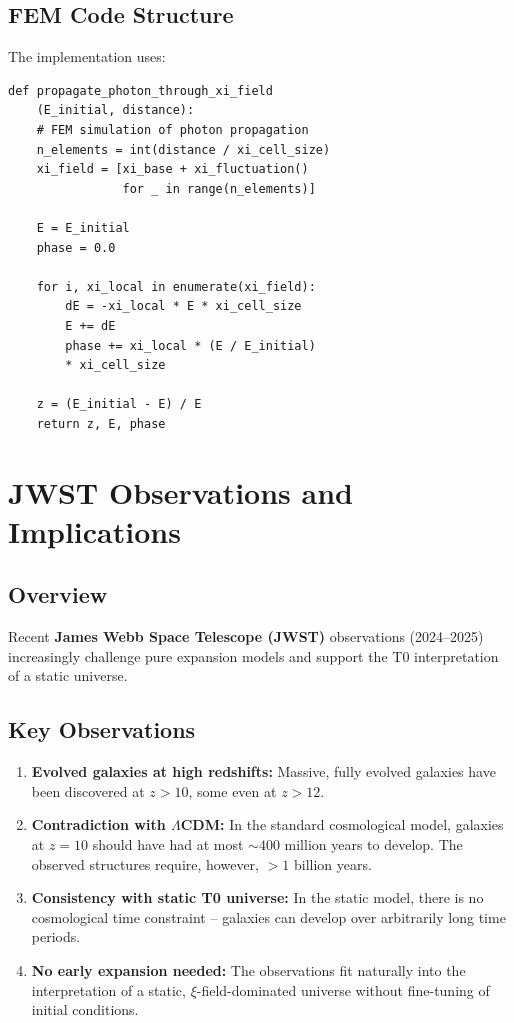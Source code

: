 \subsection{FEM Code Structure}

The implementation uses:

\begin{verbatim}
def propagate_photon_through_xi_field
	(E_initial, distance):
    # FEM simulation of photon propagation
    n_elements = int(distance / xi_cell_size)
    xi_field = [xi_base + xi_fluctuation() 
                for _ in range(n_elements)]
    
    E = E_initial
    phase = 0.0
    
    for i, xi_local in enumerate(xi_field):
        dE = -xi_local * E * xi_cell_size
        E += dE
        phase += xi_local * (E / E_initial)
        * xi_cell_size
    
    z = (E_initial - E) / E
    return z, E, phase
\end{verbatim}

\section{JWST Observations and Implications}

\subsection{Overview}

Recent \textbf{James Webb Space Telescope (JWST)} observations (2024--2025) 
increasingly challenge pure expansion models and support the T0 interpretation 
of a static universe.

\subsection{Key Observations}

\begin{enumerate}
\item \textbf{Evolved galaxies at high redshifts:} 
      Massive, fully evolved galaxies have been discovered at $z > 10$, 
      some even at $z > 12$.
      
\item \textbf{Contradiction with $\Lambda$CDM:} 
      In the standard cosmological model, galaxies at $z=10$ should have had 
      at most $\sim 400$ million years to develop. The observed structures 
      require, however, $> 1$ billion years.
      
\item \textbf{Consistency with static T0 universe:} 
      In the static model, there is no cosmological time constraint -- 
      galaxies can develop over arbitrarily long time periods.
      
\item \textbf{No early expansion needed:} 
      The observations fit naturally into the interpretation of a static, 
      $\xi$-field-dominated universe without fine-tuning of initial conditions.
\end{enumerate}

